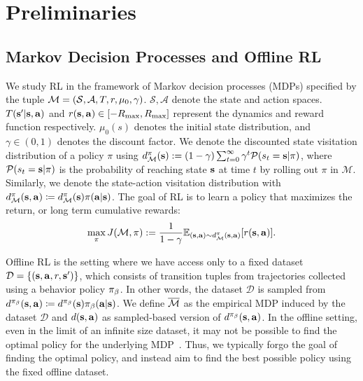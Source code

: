 \section{Preliminaries}
\label{sec:prelim}

\subsection{Markov Decision Processes and Offline RL} 

We study RL in the framework of Markov decision processes (MDPs) specified by the tuple $\mathcal{M} = (\mathcal{S}, \mathcal{A}, T, r, \mu_0, \gamma)$.
$\mathcal{S}, \mathcal{A}$ denote the state and action spaces. 
$T(\mathbf{s}' | \mathbf{s}, \mathbf{a})$ and $r(\mathbf{s},\mathbf{a}) \in [-R_{\max}, R_{\max}]$ represent the dynamics and reward function respectively. 
$\mu_0(s)$ denotes the initial state distribution, and $\gamma \in (0,1)$ denotes the discount factor. 
We denote the discounted state visitation distribution of a policy $\pi$ using \hbox{$d_\mathcal{M}^\pi(\mathbf{s}) := (1 - \gamma)\sum_{t=0}^\infty\gamma^t\mathcal{P}(s_t = \mathbf{s} | \pi)$}, where $\mathcal{P}(s_t = \mathbf{s} | \pi)$ is the probability of reaching state $\mathbf{s}$ at time $t$ by rolling out $\pi$ in $\mathcal{M}$. Similarly, we denote the state-action visitation distribution with $d_\mathcal{M}^\pi(\mathbf{s}, \mathbf{a}) \coloneqq d_\mathcal{M}^\pi(\mathbf{s})\pi(\mathbf{a}|\mathbf{s})$. The goal of RL is to learn a policy that maximizes the return, or long term cumulative rewards:
\begin{equation}
    \max_\pi J(\mathcal{M}, \pi) := \frac{1}{1-\gamma}\mathbb{E}_{(\mathbf{s}, \mathbf{a}) \sim d_\mathcal{M}^\pi(\mathbf{s}, \mathbf{a})}[r(\mathbf{s}, \mathbf{a})].
\end{equation}


Offline RL is the setting where we have access only to a fixed dataset $\mathcal{D} = \{(\mathbf{s}, \mathbf{a}, r, \mathbf{s}')\}$, which consists of transition tuples from trajectories collected using a behavior policy ${\pi_\beta}$. In other words, the dataset $\mathcal{D}$ is sampled from $d^{\pi_\beta}(\mathbf{s}, \mathbf{a}) \coloneqq d^{\pi_\beta}(\mathbf{s}) {\pi_\beta}(\mathbf{a}|\mathbf{s})$. We define $\overline{\mathcal{M}}$ as the empirical MDP induced by the dataset $\mathcal{D}$ and $d(\mathbf{s},\mathbf{a})$ as sampled-based version of $d^{\pi_\beta}(\mathbf{s}, \mathbf{a})$. In the offline setting, even in the limit of an infinite size dataset, it may not be possible to find the optimal policy for the underlying MDP~\cite{Chen2019InformationTheoreticCI, kidambi2020morel}.
Thus, we typically forgo the goal of finding the optimal policy, and instead aim to find the best possible policy using the fixed offline dataset.

